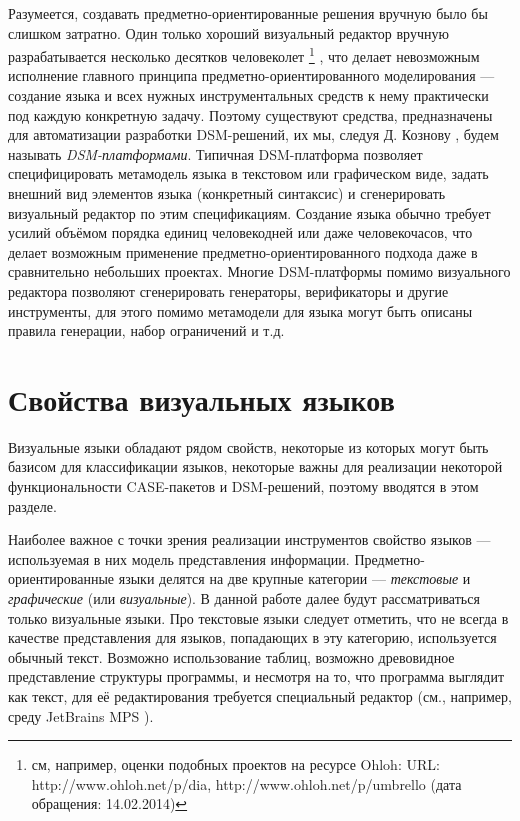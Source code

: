 Разумеется, создавать предметно-ориентированные решения вручную было бы слишком 
затратно. Один только хороший визуальный редактор вручную разрабатывается 
несколько десятков человеколет
\footnote{см, например, оценки подобных проектов на ресурсе Ohloh: 
URL: http://www.ohloh.net/p/dia, http://www.ohloh.net/p/umbrello (дата обращения: 14.02.2014)}
, что делает невозможным исполнение главного 
принципа предметно-ориентированного моделирования --- создание языка и всех 
нужных инструментальных средств к нему практически под каждую конкретную задачу. 
Поэтому существуют средства, предназначены для автоматизации разработки 
DSM-решений, их мы, следуя Д. Кознову 
, будем называть \textit{DSM-платформами}. Типичная DSM-платформа позволяет 
специфицировать метамодель языка в текстовом или графическом виде, задать 
внешний вид элементов языка (конкретный синтаксис) и сгенерировать визуальный 
редактор по этим спецификациям. Создание языка обычно требует усилий объёмом 
порядка единиц человекодней или даже человекочасов, что делает возможным 
применение предметно-ориентированного подхода даже в сравнительно небольших 
проектах. Многие DSM-платформы помимо визуального редактора позволяют 
сгенерировать генераторы, верификаторы и другие инструменты, для этого помимо 
метамодели для языка могут быть описаны правила генерации, набор ограничений 
и т.д.

\section{Свойства визуальных языков}
Визуальные языки обладают рядом свойств, некоторые из которых могут быть базисом 
для классификации языков, некоторые важны для реализации некоторой 
функциональности CASE-пакетов и DSM-решений, поэтому вводятся в этом разделе.

Наиболее важное с точки зрения реализации инструментов свойство языков --- 
используемая в них модель представления информации. Предметно-ориентированные 
языки делятся на две крупные категории --- \textit{текстовые} и \textit{графические} 
(или \textit{визуальные}). В данной работе далее будут рассматриваться только визуальные 
языки. 
Про текстовые языки следует отметить, что не всегда в качестве 
представления для языков, попадающих в эту категорию, используется обычный 
текст. Возможно использование таблиц, возможно древовидное представление 
структуры программы, и несмотря на то, что программа выглядит как текст, 
для её редактирования требуется специальный редактор (см., например, среду 
JetBrains MPS 
).

